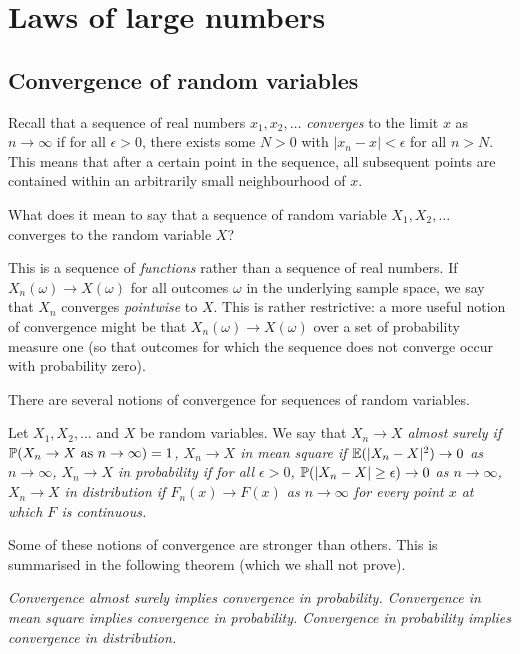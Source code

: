 
\section{Laws of large numbers}\label{sec:lln}

\subsection{Convergence of random variables}

Recall that a sequence of real numbers $x_1,x_2,\ldots$ \emph{converges} to the limit $x$ as $n\to\infty$ if for all $\epsilon>0$, there exists some $N>0$ with $|x_n - x|<\epsilon$ for all $n > N$. This means that after a certain point in the sequence, all subsequent points are contained within an arbitrarily small neighbourhood of $x$.

What does it mean to say that a sequence of random variable $X_1,X_2,\ldots$  converges to the random variable $X$? 

This is a sequence of \emph{functions} rather than a sequence of real numbers. If $X_n(\omega)\to X(\omega)$ for all outcomes $\omega$ in the underlying sample space, we say that $X_n$ converges \emph{pointwise} to $X$. This is rather restrictive: a more useful notion of convergence might be that $X_n(\omega)\to X(\omega)$ over a set of probability measure one (so that outcomes for which the sequence does not converge occur with probability zero).

There are several notions of convergence for sequences of random variables.
\begin{definition}
Let $X_1,X_2,\ldots$ and $X$ be random variables. We say that
\ben
\it %
$X_n\to X$ \emph{almost surely} if $\mathbb{P}(X_n\to X \text{ as } n\to\infty) = 1$,
\it %
$X_n\to X$ \emph{in mean square} if $\mathbb{E}(|X_n - X|^2) \to 0$ as $n\to\infty$,
\it %
$X_n\to X$ \emph{in probability} if for all $\epsilon > 0$, $\mathbb{P}(|X_n-X|\geq\epsilon) \to 0$ as $n\to\infty$,
\it %
$X_n\to X$ \emph{in distribution} if $F_n(x)\to F(x)$ as $n\to\infty$ for every point $x$ at which $F$ is continuous.
\een
\end{definition}

Some of these notions of convergence are stronger than others. This is summarised in the following theorem (which we shall not prove).
\begin{theorem}
\ben
\it Convergence almost surely implies convergence in probability.
\it Convergence in mean square implies convergence in probability.
\it Convergence in probability implies convergence in distribution.
\een
\end{theorem}

